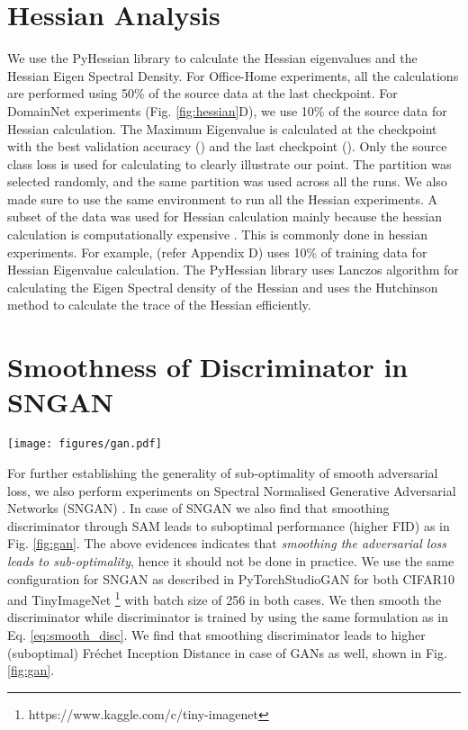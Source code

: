 \documentclass[table,dvipsnames]{article}
\theoremstyle{plain}
\theoremstyle{definition}
\theoremstyle{remark}
\begin{document}
\section{Hessian Analysis}\label{app:hess}
We use the PyHessian library \citep{yao2020pyhessian} to calculate the Hessian eigenvalues and the Hessian Eigen Spectral Density. For Office-Home experiments, all the calculations are performed using 50\% of the source data at the last checkpoint. For DomainNet experiments (Fig. \ref{fig:hessian}D), we use 10\% of the source data for Hessian calculation. The Maximum Eigenvalue is calculated at the checkpoint with the best validation accuracy () and the last checkpoint (). Only the source class loss is used for calculating to clearly illustrate our point. {The partition was selected randomly, and the same partition was used across all the runs. We also made sure to use the same environment to run all the Hessian experiments. A subset of the data was used for Hessian calculation mainly because the hessian calculation is computationally expensive \citep{yao2020pyhessian}. This is commonly done in hessian experiments. For example, \citep{chen2021vision} (refer Appendix D) uses 10\% of training data for Hessian Eigenvalue calculation}. 
The PyHessian library uses Lanczos algorithm \citep{ghorbani2019investigation} for calculating the Eigen Spectral density of the Hessian and uses the Hutchinson method to calculate the trace of the Hessian efficiently. 

\section{Smoothness of Discriminator in SNGAN}
\label{app:gan_exp}
\begin{figure*}[!t]
  \centering
  \texttt{[image: figures/gan.pdf]}
  \caption{SNGAN performance on different datasets, smoothing discriminator in GAN also leads to inferior GAN performance (higher FID) across both datasets.}
  \label{fig:gan}
\end{figure*}
For further establishing the generality of sub-optimality of smooth adversarial loss, we also perform experiments on Spectral Normalised Generative Adversarial Networks (SNGAN) \citep{miyato2018spectral}. In case of SNGAN we also find that smoothing discriminator through SAM leads to suboptimal performance (higher FID) as in Fig. \ref{fig:gan}. The above evidences indicates that \textit{smoothing the adversarial loss leads to sub-optimality}, hence it should not be done in practice. 
We use the same configuration for SNGAN as described in PyTorch\-StudioGAN \citep{kang2020ContraGAN}  for both CIFAR10 \citep{krizhevsky2009learning} and TinyImageNet \footnote{https://www.kaggle.com/c/tiny-imagenet} with batch size of 256 in both cases. We then smooth the discriminator while discriminator is trained by using the same formulation as in Eq. \ref{eq:smooth_disc}. We find that smoothing discriminator leads to higher (suboptimal) Fr\'{e}chet Inception Distance in case of GANs as well, shown in Fig. \ref{fig:gan}.
\end{document}

